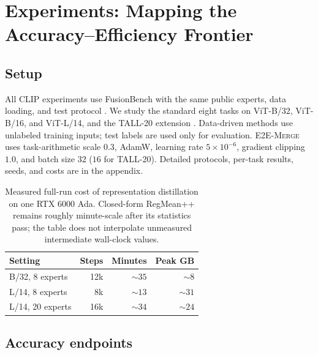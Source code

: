 \documentclass[letterpaper]{article} %
\newcommand{\method}{\textup{\textsc{E2E-Merge}}\xspace}
\theoremstyle{plain}
\theoremstyle{definition}
\begin{document}
\section{Experiments: Mapping the Accuracy--Efficiency Frontier}
\label{sec:experiments}

\subsection{Setup}
All CLIP experiments use FusionBench with the same public experts, data loading, and test
protocol \citep{tang2024fusionbench}. We study the standard eight tasks on ViT-B/32,
ViT-B/16, and ViT-L/14, and the TALL-20 extension
\citep{ilharco2023taskarithmetic,wang2024tall}. Data-driven methods use unlabeled training
inputs; test labels are used only for evaluation. \method uses task-arithmetic scale
$0.3$, AdamW, learning rate $5\times10^{-6}$, gradient clipping $1.0$, and batch size $32$
($16$ for TALL-20). Detailed protocols, per-task results, seeds, and costs are in the
appendix.

\begin{table}[tb]
\centering
\small
\setlength{\tabcolsep}{3.5pt}
\begin{tabular*}{\columnwidth}{@{\extracolsep{\fill}}lrrr}
\toprule
Setting & Steps & Minutes & Peak GB \\
\midrule
B/32, 8 experts & 12k & $\sim35$ & $\sim8$ \\
L/14, 8 experts & 8k & $\sim13$ & $\sim31$ \\
L/14, 20 experts & 16k & $\sim34$ & $\sim24$ \\
\bottomrule
\end{tabular*}
\caption{Measured full-run cost of representation distillation on one RTX 6000 Ada.
Closed-form RegMean++ remains roughly minute-scale after its statistics pass; the table does
not interpolate unmeasured intermediate wall-clock values.}
\label{tab:measured-cost-main}
\end{table}

\subsection{Accuracy endpoints}
\end{document}
